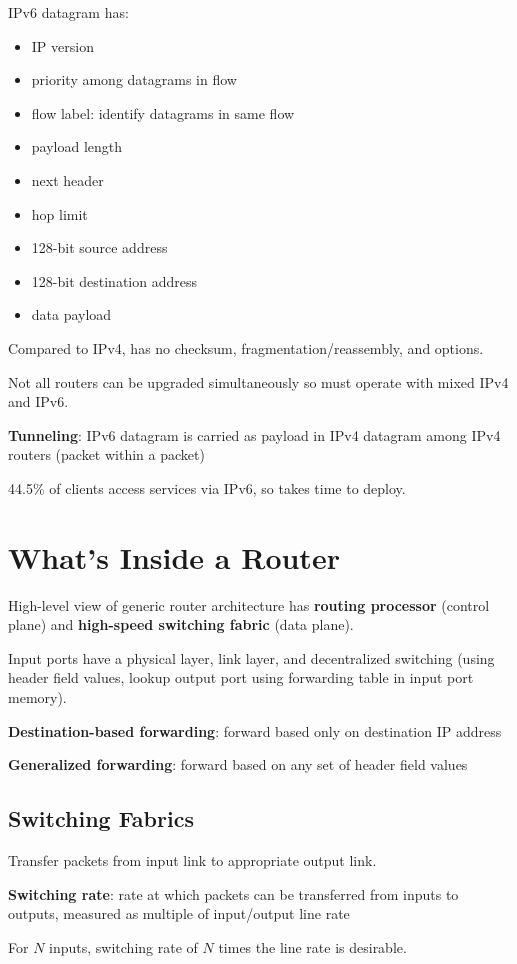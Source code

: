 \documentclass[11pt]{article}
\begin{document}
IPv6 datagram has:
\begin{itemize}
\item IP version
\item priority among datagrams in flow
\item flow label: identify datagrams in same flow
\item payload length
\item next header
\item hop limit
\item 128-bit source address
\item 128-bit destination address
\item data payload
\end{itemize}

Compared to IPv4, has no checksum, fragmentation/reassembly, and options.

Not all routers can be upgraded simultaneously so must operate with mixed IPv4
and IPv6.

\textbf{Tunneling}: IPv6 datagram is carried as payload in IPv4 datagram among IPv4
routers (packet within a packet)

44.5\% of clients access services via IPv6, so takes time to deploy.
\section{What's Inside a Router}
\label{sec:org6df41e9}
High-level view of generic router architecture has \textbf{routing processor} (control plane) and
\textbf{high-speed switching fabric} (data plane).

Input ports have a physical layer, link layer, and decentralized switching (using header
field values, lookup output port using forwarding table in input port memory).

\textbf{Destination-based forwarding}: forward based only on destination IP address

\textbf{Generalized forwarding}: forward based on any set of header field values
\subsection{Switching Fabrics}
\label{sec:org50a226b}
Transfer packets from input link to appropriate output link.

\textbf{Switching rate}: rate at which packets can be transferred from inputs to outputs,
measured as multiple of input/output line rate

For \(N\) inputs, switching rate of \(N\) times the line rate is desirable.
\end{document}
